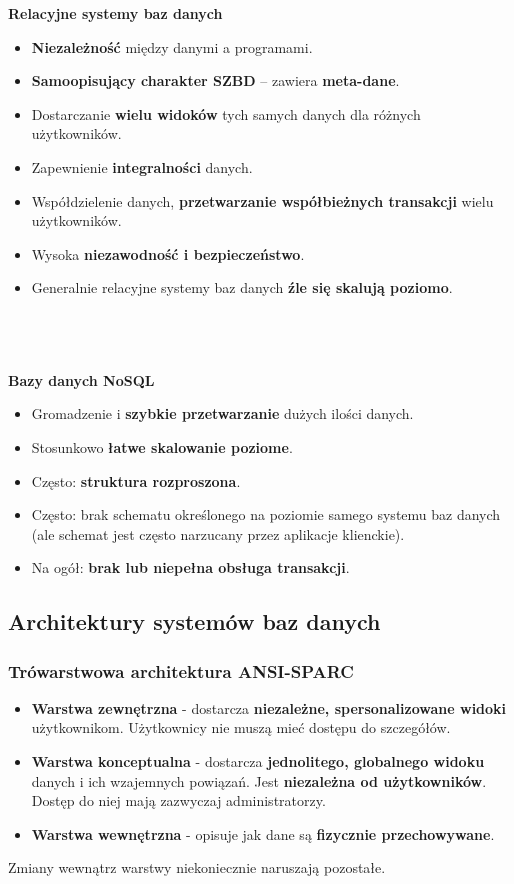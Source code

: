 \documentclass[a4paper]{article}
\begin{document}
\textbf{Relacyjne systemy baz danych}
\begin{itemize}
    \item \textbf{Niezależność} między danymi a programami.
    \item \textbf{Samoopisujący charakter SZBD} – zawiera \textbf{meta-dane}.
    \item Dostarczanie \textbf{wielu widoków}  tych samych danych dla różnych użytkowników.
    \item Zapewnienie \textbf{integralności} danych.
    \item Współdzielenie danych, \textbf{przetwarzanie współbieżnych transakcji} wielu użytkowników.
    \item Wysoka \textbf{niezawodność i bezpieczeństwo}.
    \item Generalnie relacyjne systemy baz danych \textbf{źle się skalują poziomo}.
\end{itemize}
\hfill \\\\\\
\textbf{Bazy danych NoSQL}
\begin{itemize}
    \item Gromadzenie i \textbf{szybkie przetwarzanie} dużych ilości danych.
    \item Stosunkowo \textbf{łatwe skalowanie poziome}.
    \item Często: \textbf{struktura rozproszona}.
    \item Często: brak schematu określonego na poziomie samego systemu baz danych (ale schemat jest często narzucany przez aplikacje klienckie).
    \item Na ogół: \textbf{brak lub niepełna obsługa transakcji}.
\end{itemize}

\subsection{Architektury systemów baz danych}

\subsubsection{Trówarstwowa architektura ANSI-SPARC}
\begin{itemize}
    \item \textbf{Warstwa zewnętrzna} - dostarcza \textbf{niezależne, spersonalizowane widoki} użytkownikom. Użytkownicy nie muszą mieć dostępu do szczegółów.
    \item \textbf{Warstwa konceptualna} - dostarcza \textbf{jednolitego, globalnego widoku} danych i ich wzajemnych powiązań. Jest \textbf{niezależna od użytkowników}. Dostęp do niej mają zazwyczaj administratorzy.
    \item \textbf{Warstwa wewnętrzna} -  opisuje jak dane są \textbf{fizycznie przechowywane}.
\end{itemize}
Zmiany wewnątrz warstwy niekoniecznie naruszają pozostałe.
\end{document}

